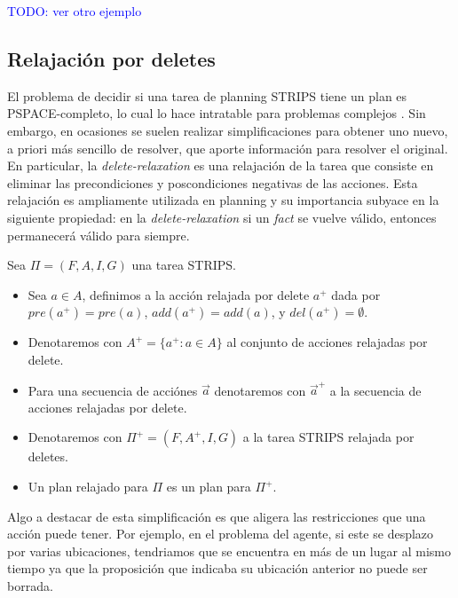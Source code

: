 \textcolor{blue}{TODO: ver otro ejemplo}

\subsection{Relajación por deletes}

El problema de decidir si una tarea de planning STRIPS tiene un plan es
PSPACE-completo, lo cual lo hace intratable para problemas complejos
\citep{Nau-Ghallab-Malik-Traverso-2004}. Sin embargo, en ocasiones se suelen
realizar simplificaciones para obtener uno nuevo, a priori más sencillo de
resolver, que aporte información para resolver el original. En particular, la
\emph{delete-relaxation} es una relajación de la tarea que consiste en eliminar
las precondiciones y poscondiciones negativas de las acciones. Esta relajación
es ampliamente utilizada en planning y su importancia subyace en la siguiente
propiedad: en la \emph{delete-relaxation} si un \emph{fact} se vuelve válido,
entonces permanecerá válido para siempre.

\begin{mydef}
    Sea $\Pi = (F, A, I, G)$ una tarea STRIPS.
    \begin{itemize}
        \item Sea $a \in A$, definimos a la acción relajada por delete $a^{+}$
        dada por $pre(a^{+}) = pre(a)$, $add(a^{+}) = add(a)$, y $del(a^{+}) =
        \emptyset$.

        \item Denotaremos con $A^{+} = \{a^{+} : a \in A\}$ al conjunto de
        acciones relajadas por delete.

        \item Para una secuencia de acciónes $\vec{a}$ denotaremos con
        $\vec{a}^{+}$ a la secuencia de acciones relajadas por delete.

        \item Denotaremos con $\Pi^{+} = (F, A^{+}, I, G)$ a la tarea STRIPS
        relajada por deletes.

        \item Un plan relajado para $\Pi$ es un plan para $\Pi^{+}$.
    \end{itemize}
\end{mydef}

Algo a destacar de esta simplificación es que aligera las restricciones que una
acción puede tener. Por ejemplo, en el problema del agente, si este se desplazo
por varias ubicaciones, tendriamos que se encuentra en más de un lugar al mismo
tiempo ya que la proposición que indicaba su ubicación anterior no puede ser
borrada.

